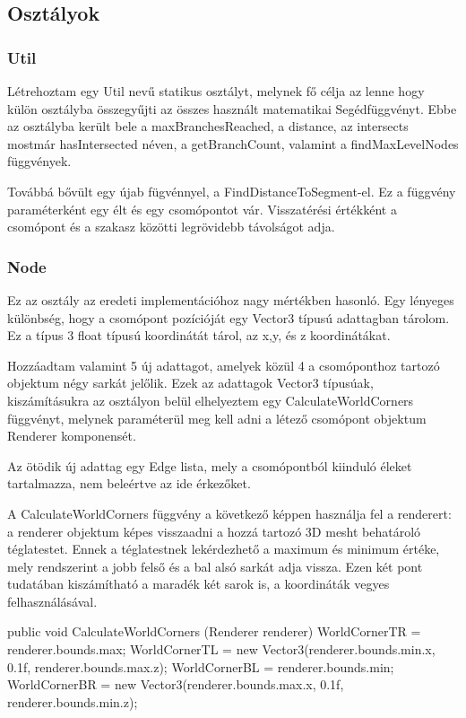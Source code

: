 \subsection{Osztályok}
\subsubsection{Util}
Létrehoztam egy Util nevű statikus osztályt, melynek fő célja az lenne hogy külön osztályba összegyűjti az összes használt matematikai Segédfüggvényt. Ebbe az osztályba került bele a maxBranchesReached, a distance, az intersects mostmár hasIntersected néven, a getBranchCount, valamint a findMaxLevelNodes függvények. 

Továbbá bővült egy újab fügvénnyel, a FindDistanceToSegment-el. Ez a függvény paraméterként egy élt és egy csomópontot vár. Visszatérési értékként a csomópont és a szakasz közötti legrövidebb távolságot adja.
\subsubsection{Node}
Ez az osztály az eredeti implementációhoz nagy mértékben hasonló. Egy lényeges különbség, hogy a csomópont pozícióját egy Vector3 típusú adattagban tárolom. Ez a típus 3 float típusú koordinátát tárol, az x,y, és z koordinátákat.

Hozzáadtam valamint 5 új adattagot, amelyek közül 4 a csomóponthoz tartozó objektum négy sarkát jelőlik. Ezek az adattagok Vector3 típusúak, kiszámításukra az osztályon belül elhelyeztem egy CalculateWorldCorners függvényt, melynek paraméterül meg kell adni a létező csomópont objektum Renderer komponensét.

Az ötödik új adattag egy Edge lista, mely a csomópontból kiinduló éleket tartalmazza, nem beleértve az ide érkezőket.

A CalculateWorldCorners függvény a következő képpen használja fel a renderert: a renderer objektum képes visszaadni a hozzá tartozó 3D mesht behatároló téglatestet. Ennek a téglatestnek lekérdezhető a maximum és minimum értéke, mely rendszerint a jobb felső és a bal alsó sarkát adja vissza. Ezen két pont tudatában kiszámítható a maradék két sarok is, a koordináták vegyes felhasználásával.
\begin{cpp}
public void CalculateWorldCorners (Renderer renderer)
        {
            WorldCornerTR = renderer.bounds.max;
            WorldCornerTL = new Vector3(renderer.bounds.min.x, 
            0.1f, renderer.bounds.max.z);
            WorldCornerBL = renderer.bounds.min;
            WorldCornerBR = new Vector3(renderer.bounds.max.x,
            0.1f, renderer.bounds.min.z);
        }
\end{cpp}
